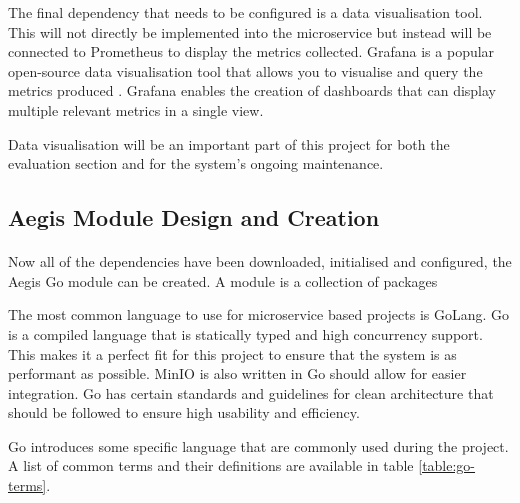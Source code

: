 \documentclass[12pt, conference, final, a4paper, onecolumn, compsoc]{IEEEtran}
\begin{document}
The final dependency that needs to be configured is a data visualisation tool.
This will not directly be implemented into the microservice but instead will be
connected to Prometheus to display the metrics collected. Grafana is a popular
open-source data visualisation tool that allows you to visualise and query
the metrics produced \citep{multi-cloud}. Grafana enables the creation of
dashboards that can display multiple relevant metrics in a single view.

Data visualisation will be an important part of this project for both the
evaluation section and for the system's ongoing maintenance.

\subsection{Aegis Module Design and Creation}
\paragraph{}

Now all of the dependencies have been downloaded, initialised and configured,
the Aegis Go module can be created. A module is a collection of packages

The most common language to use for microservice based projects is GoLang. Go is
a compiled language that is statically typed and high concurrency support. This
makes it a perfect fit for this project to ensure that the system is as
performant as possible. MinIO is also written in Go should allow for easier
integration. Go has certain standards and guidelines for clean architecture that
should be followed to ensure high usability and efficiency.

Go introduces some specific language that are commonly used during the project.
A list of common terms and their definitions are available in table
\ref{table:go-terms}.
\end{document}
